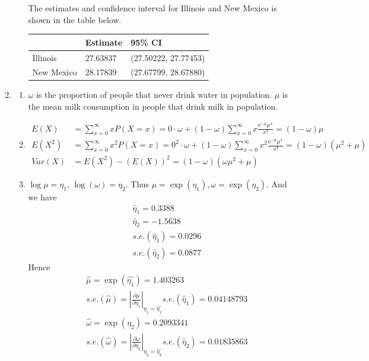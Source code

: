 \documentclass{article}
\begin{document}
\begin{enumerate}[leftmargin = 0 em, label = \arabic*., font = \bfseries]
\begin{enumerate}
	 The estimates and confidence interval for Illinois and New Mexico is shown in the table below.
	 \begin{center}
	 	\begin{tabular}{lll}
	 	\toprule
	 	 & Estimate & 95\% CI\\
	 	 \midrule
	 	 Illinois & 27.63837 & (27.50222, 27.77453)\\
	 	 New Mexico & 28.17839 & (27.67799, 28.67880) \\
	 	 \bottomrule
	 	\end{tabular}
	 \end{center}
	\end{enumerate}

	\item 
	\begin{enumerate}
		\item 
		$\omega$ is the proportion of people that never drink water in population. $\mu$ is the mean milk consumption in people that drink milk in population.

		 \item 
		 \begin{align*}
		  E(X) &= \sum_{x = 0}^\infty x P(X = x) = 0 \cdot  \omega + (1 - \omega) \sum_{x = 0}^\infty x \frac{\mathrm{e}^{-\mu} \mu^{x}}{x!} = (1 - \omega)\mu\\
		  E(X^2) & = \sum_{x = 0}^\infty x^2 P(X = x) = 0^2 \cdot \omega + (1 - \omega) \sum_{x = 0}^\infty x^2 \frac{\mathrm{e}^{-\mu} \mu^{x}}{x!} = (1 - \omega)(\mu^2 + \mu)\\
		  Var(X) &= E(X^2) - (E(X))^2 = (1 - \omega)(\omega \mu^2 + \mu)
		  \end{align*}

		  \item 
		  $\log \mu = \eta_1,\, \log(\omega) = \eta_2$. Thus $\mu = \exp(\eta_1), \omega = \exp(\eta_2)$. And we have
		  \begin{align*}
		   &\hat{\eta}_1 = 0.3388\\
		   & \hat{\eta}_2 = -1.5638\\
		   &s.e.(\hat{\eta}_1) = 0.0296\\
		   & s.e.(\hat{\eta}_2) = 0.0877
		   \end{align*}
		   Hence 
		   \begin{align*}
		   &\hat{\mu} = \exp(\hat{\eta_1}) = 1.403263\\
		   &s.e.(\hat{\mu}) = \left|\frac{\partial \mu}{\partial \eta_1}\right|_{\eta_1 = \hat{\eta_1}} s.e.(\hat{\eta}_1) = 0.04148793\\
		   &\hat{\omega} = \exp(\eta_2) = 0.2093341 \\
		   &s.e.(\hat{\omega}) = \left|\frac{\partial \omega}{\partial \eta_2}\right|_{\eta_2 = \hat{\eta_2}} s.e.(\hat{\eta}_2) = 0.01835863 
		   \end{align*}



\end{enumerate}
\end{enumerate}
\end{document}
